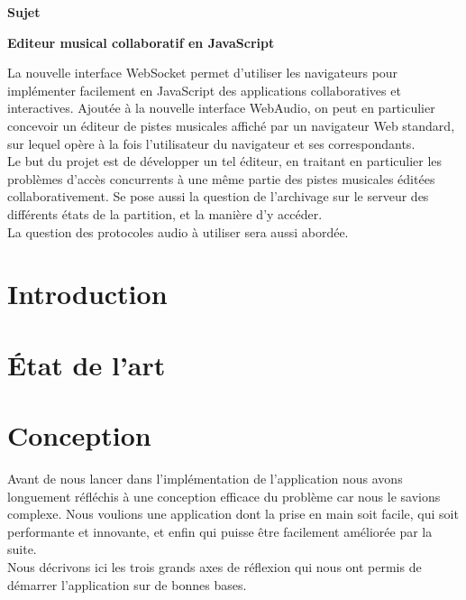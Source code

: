 \documentclass[12pt,a4paper]{article}
\begin{document}



\begin{center}
{\huge \bfseries Sujet}\\[1.5cm]
\end{center}
{\Large \bfseries Editeur musical collaboratif en JavaScript}

\bigskip
La nouvelle interface WebSocket permet d’utiliser les navigateurs pour implémenter facilement en JavaScript des applications collaboratives et interactives. Ajoutée à la nouvelle interface WebAudio, on peut en particulier concevoir un éditeur de pistes musicales affiché par un navigateur Web standard, sur lequel opère à la fois l’utilisateur du navigateur et ses correspondants.\\
Le but du projet est de développer un tel éditeur, en traitant en particulier les problèmes d’accès concurrents à une même partie des pistes musicales éditées collaborativement. Se pose aussi la question de l’archivage sur le serveur des différents états de la partition, et la manière d’y accéder.\\
La question des protocoles audio à utiliser sera aussi abordée.

\vfill

\pagebreak

\tableofcontents

\pagebreak

\section{Introduction}

\section{État de l'art}


\section{Conception}

Avant de nous lancer dans l’implémentation de l’application nous avons longuement réfléchis à une conception efficace du problème car nous le savions complexe. Nous voulions une application dont la prise en main soit facile, qui soit performante et innovante, et enfin qui puisse être facilement améliorée par la suite.\\
Nous décrivons ici les trois grands axes de réflexion qui nous ont permis de démarrer l’application sur de bonnes bases.
\end{document}
